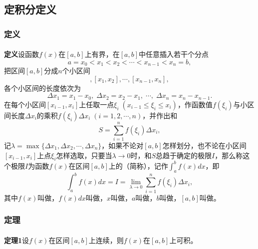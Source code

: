 \subsection{定积分定义}
\subsubsection{定义}
\paragraph{}
\textbf{定义\;}设函数$f(x)$在$[a,b]$上有界，在$[a,b]$中任意插入若干个分点
\begin{equation*}
  a = x_0 < x_1 < x_2 < \cdots < x_{n-1} < x_n = b,
\end{equation*}
把区间$[a,b]$分成$n$个小区间
\begin{equation*}
  [x_0,x_1], [x_1,x_2], \cdots, [x_{n-1},x_n],
\end{equation*}
各个小区间的长度依次为
\begin{equation*}
  \Delta x_1 = x_1 - x_0, \; \Delta x_2 = x_2 - x_1, \; \cdots, \; \Delta x_n = x_n - x_{n-1}.
\end{equation*}
在每个小区间$[x_{i-1}, x_i]$上任取一点$\xi_i \; (x_{i-1} \leq \xi_i \leq x_i)$，作函数值$f(\xi_i)$与小区间长度$\Delta x_i$的乘积$f(\xi_i)\Delta x_i \; (i=1,2,\cdots,n)$，并作出和
\begin{equation}
  S = \sum_{i=1}^n f(\xi_i)\Delta x_i,
\end{equation}
记$\lambda = \max\{\Delta x_1, \Delta x_2, \cdots, \Delta x_n\}$，如果不论对$[a,b]$怎样划分，也不论在小区间$[x_{i-1}, x_i]$上点$\xi_i$怎样选取，只要当$\lambda \to 0$时，和$S$总趋于确定的极限$I$，那么称这个极限$I$为函数$f(x)$在区间$[a,b]$上的（简称），记作$\displaystyle\int_a^bf(x)dx$，即
\begin{equation}
  \int_a^bf(x)dx = I = \lim_{\lambda \to 0}\sum_{i=1}^nf(\xi_i)\Delta x_i,
\end{equation}
其中$f(x)$叫做，$f(x)dx$叫做，$x$叫做，$a$叫做，$b$叫做，$[a,b]$叫做。

\subsubsection{定理}
\paragraph{}
\textbf{定理1\;}设$f(x)$在区间$[a,b]$上连续，则$f(x)$在$[a,b]$上可积。


